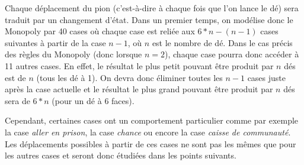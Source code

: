 \documentclass[letterpaper]{article}
\newcommand{\colornode}[1][]{\node[state,
	    align=center,
	    text=gray!40!black,
	    draw=gray,
	    fill=gray!20!white,{#1}]}
\newcommand{\drawedge}{\draw[every loop, line width=0.4mm, fill=gray, draw=gray]}
\begin{document}
    Chaque déplacement du pion (c'est-à-dire à chaque fois que l'on lance le dé) sera 
    traduit par un changement d'état.
    Dans un premier temps, on modélise donc le Monopoly par 40 cases où chaque case est
    reliée aux $6*n-(n-1)$ cases suivantes à partir de la case $n-1$, où $n$ est le 
    nombre de dé.  Dans le cas précis des règles du Monopoly (donc lorsque $n = 2$), 
    chaque case pourra donc accéder à 11 autres cases.  En effet, le résultat le plus 
    petit pouvant être produit par $n$ dés est de $n$ (tous les dé à 1).
    On devra donc éliminer toutes les $n-1$ cases juste après la case actuelle et le résultat
    le plus grand pouvant être produit par $n$ dés sera de $6*n$ (pour un dé à 6 faces).
    \begin{center}
    \end{center}
    Cependant, certaines cases ont un comportement particulier comme par exemple la 
    case \textit{aller en prison}, la case \textit{chance} ou encore la case
    \textit{caisse de communauté}.  Les déplacements possibles à partir de ces cases
    ne sont pas les mêmes que pour les autres cases et seront donc étudiées dans les 
    points suivants.
    
\end{document}
